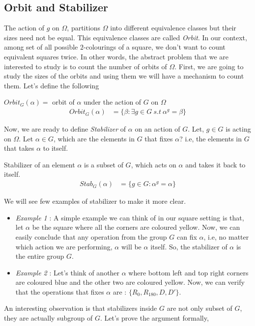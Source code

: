 \subsection{Orbit and Stabilizer}
The action of $g$ on $\Omega$, partitions $\Omega$ into different equivalence classes but their sizes need not be equal. This equivalence classes are called \emph{Orbit}. In our context, among set of all possible $2$-colourings of a square, we don't want to count equivalent squares twice. In other words, the abstract problem that we are interested to study is to count the number of orbits of $\Omega$. First, we are going to study the sizes of the orbits and using them we will have a mechanism to count them. Let's define the following
\begin{definition}
$Orbit_G(\alpha)=$ orbit of $\alpha$ under the action of $G$ on $\Omega$
\begin{align*}
Orbit_G(\alpha)&=\{\beta:\exists g\in G \ s.t \ \alpha^g=\beta \}
\end{align*}
\end{definition}
Now, we are ready to define \emph{Stabilizer} of $\alpha$ on an action of $G$. Let, $g\in G$ is acting on $\Omega$. Let $\alpha\in G$, which are  the elements in $G$ that fixes $\alpha$? i.e, the elements in $G$ that takes $\alpha$ to itself. 
\begin{definition}
Stabilizer of an element $\alpha$ is a subset of $G$, which acts on $\alpha$ and takes it back to itself.
\begin{align*}
Stab_G(\alpha)&=\{g\in G: \alpha^g=\alpha \}
\end{align*}
\end{definition}
We will see few examples of stabilizer to make it more clear. 
\begin{itemize}
\item \emph{Example 1} : A simple example we can think of in our square setting is that, let $\alpha$ be the square where all the corners are coloured yellow. Now, we can easily conclude that any operation from the group $G$ can fix $\alpha$, i.e, no matter which action we are performing, $\alpha$ will be $\alpha$ itself. So, the stabilizer of $\alpha$ is the entire group $G$.
\item \emph{Example 2} : Let's think of another $\alpha$ where bottom left and top right corners are coloured blue and the other two are coloured yellow. Now, we can verify that the operations that fixes $\alpha$ are : $\{R_0,R_{180},D,D' \} $. 
\end{itemize}
An interesting observation is that stabilizers inside $G$ are not only subset of $G$, they are actually subgroup of $G$. Let's prove the argument formally,
